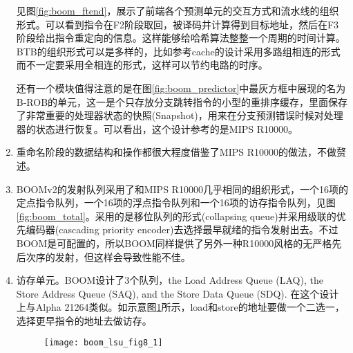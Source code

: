 \begin{enumerate}[label=(\alph*)]
	见图\ref{fig:boom_ftend}，展示了前端各个预测单元的交互方式和流水线的组织形式。可以看到指令在F2阶段取回，被译码并计算得到目标地址，然后在F3阶段给出指令重定向的信息。这样能够给哈希算法整整一个周期的时间计算。BTB的组织形式可以是多样的，比如参考cache的设计采用多路组相连的形式而不一定要采用全相连的形式，这样可以节约电路的时序。
	
	还有一个模块值得注意的是在图\ref{fig:boom_predictor}中最灰方框中展现的名为B-ROB的单元，这一是个只存放分支跳转指令的小型的重排序缓存，里面保存了非常重要的处理器状态的快照(Snapshot)，用来在分支预测错误时候对处理器的状态进行恢复。可以看出，这个设计参考的是MIPS R10000。
	\item 重命名阶段的数据结构和操作都很大程度借鉴了MIPS R10000的做法，不做赘述。
	\item BOOMv2的发射队列采用了和MIPS R10000几乎相同的组织形式，一个16项的定点指令队列，一个16项的浮点指令队列和一个16项的访存指令队列，见图\ref{fig:boom_total}。采用的是移位队列的形式(collapsing queue)并采用级联的优先编码器(cascading priority encoder)去选择最早就绪的指令发射出去\citep{Celio:EECS-2017-157}。不过BOOM是可配置的，所以BOOM同样提供了另外一种R10000风格的无严格先后次序的发射，但这样会导致性能不佳。
	\item 访存单元。BOOM设计了3个队列，the Load Address Queue (LAQ), the Store Address Queue (SAQ), and the Store Data Queue (SDQ)\citep{BOOMDoc2018}. 在这个设计上与Alpha 21264类似。如示意图\ref{fig:LSU}所示，load和store的地址要做一个二选一，选择更早指令的地址去做访存。
	\begin{figure}[!htbp]
		\centering
		\texttt{[image: boom\_lsu\_fig8\_1]}
		\label{fig:LSU}
	\end{figure}
\end{enumerate}



